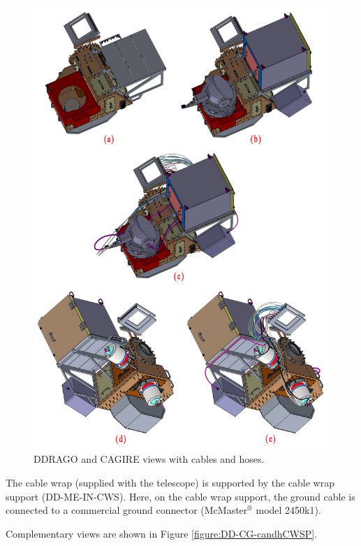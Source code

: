 \documentclass{report}
\begin{document}
\begin{figure}
\begin{center}
\includegraphics[width=0.7\linewidth]{figures/DD-Cg-ME-SS-MI_close electronics_Crdetails.png}
\end{center}
\caption{DDRAGO and CAGIRE views with cables and hoses.}
\label{figure:DD-CG-candhviews}
\end{figure}

The cable wrap (supplied with the telescope) is supported by the cable wrap support (DD-ME-IN-CWS). Here, on the cable wrap support, the ground cable is connected to a commercial ground connector (McMaster${}^\circledR$ model 2450k1).

Complementary views are shown in Figure \ref{figure:DD-CG-candhCWSP}.
\end{document}

